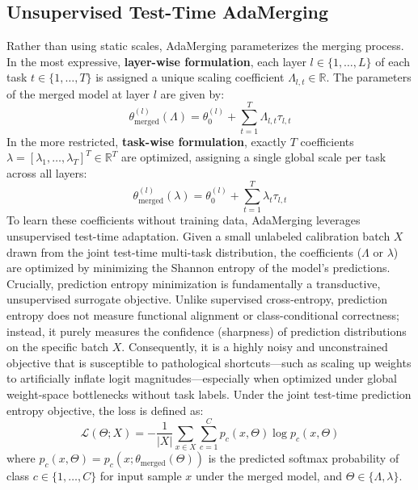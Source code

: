 \subsection{Unsupervised Test-Time AdaMerging}
Rather than using static scales, AdaMerging \cite{AdaMerging_ICLR_2024} parameterizes the merging process. In the most expressive, \textbf{layer-wise formulation}, each layer $l \in \{1, \dots, L\}$ of each task $t \in \{1, \dots, T\}$ is assigned a unique scaling coefficient $\Lambda_{l, t} \in \mathbb{R}$. The parameters of the merged model at layer $l$ are given by:
\begin{equation}
\theta_{\text{merged}}^{(l)}(\Lambda) = \theta_0^{(l)} + \sum_{t=1}^T \Lambda_{l, t} \tau_{l, t}
\end{equation}
In the more restricted, \textbf{task-wise formulation}, exactly $T$ coefficients $\lambda = [\lambda_1, \dots, \lambda_T]^T \in \mathbb{R}^T$ are optimized, assigning a single global scale per task across all layers:
\begin{equation}
\theta_{\text{merged}}^{(l)}(\lambda) = \theta_0^{(l)} + \sum_{t=1}^T \lambda_t \tau_{l, t}
\end{equation}
To learn these coefficients without training data, AdaMerging leverages unsupervised test-time adaptation. Given a small unlabeled calibration batch $X$ drawn from the joint test-time multi-task distribution, the coefficients ($\Lambda$ or $\lambda$) are optimized by minimizing the Shannon entropy of the model's predictions. Crucially, prediction entropy minimization is fundamentally a transductive, unsupervised surrogate objective. Unlike supervised cross-entropy, prediction entropy does not measure functional alignment or class-conditional correctness; instead, it purely measures the confidence (sharpness) of prediction distributions on the specific batch $X$. Consequently, it is a highly noisy and unconstrained objective that is susceptible to pathological shortcuts—such as scaling up weights to artificially inflate logit magnitudes—especially when optimized under global weight-space bottlenecks without task labels. Under the joint test-time prediction entropy objective, the loss is defined as:
\begin{equation}
\label{eq:entropy_loss}
\mathcal{L}(\Theta; X) = -\frac{1}{|X|} \sum_{x \in X} \sum_{c=1}^C p_c(x, \Theta) \log p_c(x, \Theta)
\end{equation}
where $p_c(x, \Theta) = p_c\left(x; \theta_{\text{merged}}(\Theta)\right)$ is the predicted softmax probability of class $c \in \{1, \dots, C\}$ for input sample $x$ under the merged model, and $\Theta \in \{\Lambda, \lambda\}$.

